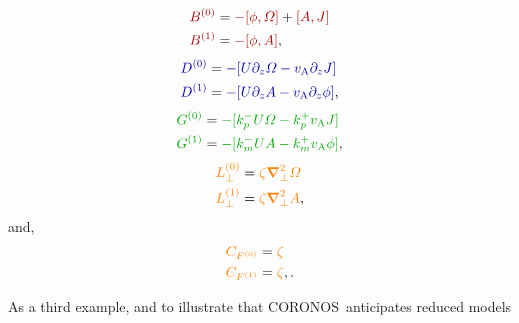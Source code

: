 \documentclass[12pt]{memoir}
\newcommand{\coronos}{\textsf{CORONOS}}
\begin{document}
%
\begin{subequations}
\begin{align}
  {\color{red!65!black}B^{(0)}} &= {\color{red!65!black}-[\phi,\Omega]} + {\color{red!65!black}[A,J]} \label{eq:irmhdbzero}  \\
  {\color{red!65!black}B^{(1)}} &= {\color{red!65!black}-[\phi,A]},                                   \label{eq:irmhdbone}
\end{align}
\end{subequations}
%                                   
\begin{subequations}
\begin{align}
  {\color{blue!65!black}D^{(0)}} &= {\color{blue!65!black} -[U\pardz\Omega - \magvalfven\pardz J]}    \label{eq:irmhddzero}   \\
  {\color{blue!65!black}D^{(1)}} &= {\color{blue!65!black} -[U\pardz A     - \magvalfven\pardz\phi]}, \label{eq:irmhddone}
\end{align}
\end{subequations}
%                                   
\begin{subequations}
\begin{align}
  {\color{green!65!black}G^{(0)}} &= {\color{green!65!black} - [\kpm U\Omega - \kpp\magvalfven    J]}    \label{eq:irmhdgzero} \\
  {\color{green!65!black}G^{(1)}} &= {\color{green!65!black} - [\kmm U A     - \kmp\magvalfven \phi]},   \label{eq:irmhdgone}
\end{align}
\end{subequations}
%
\begin{subequations}
\begin{align}
  {\color{orange}L^{(0)}_\perp} &={\color{orange}\zeta\boldsymbol{\nabla}_\perp^2\Omega} \label{eq:irmhdlzero} \\
  {\color{orange}L^{(1)}_\perp} &={\color{orange}\zeta\boldsymbol{\nabla}_\perp^2 A},    \label{eq:irmhdlone}
\end{align}
\end{subequations}
%
and,
%
\begin{subequations}
\begin{align}
  {\color{orange}C_{F^{(0)}}} &={\color{orange}\zeta}  \label{eq:rmhdczero} \\
  {\color{orange}C_{F^{(1)}}} &={\color{orange}\zeta}, \label{eq:rmhdcone}.
\end{align}
\end{subequations}
%
\par
%
As a third example, and to illustrate that \coronos\ anticipates reduced models
\end{document}
